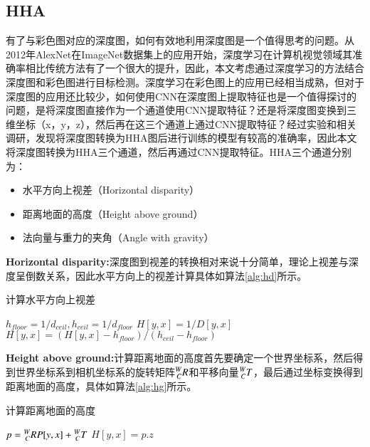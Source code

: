 \subsection{HHA}
有了与彩色图对应的深度图，如何有效地利用深度图是一个值得思考的问题。从2012年AlexNet\cite{Krizhevsky2012}在ImageNet\cite{imagenet}数据集上的应用开始，深度学习在计算机视觉领域其准确率相比传统方法有了一个很大的提升，因此，本文考虑通过深度学习的方法结合深度图和彩色图进行目标检测。深度学习在彩色图上的应用已经相当成熟，但对于深度图的应用还比较少，如何使用CNN在深度图上提取特征也是一个值得探讨的问题，是将深度图直接作为一个通道使用CNN提取特征？还是将深度图变换到三维坐标（x，y，z），然后再在这三个通道上通过CNN提取特征？经过实验和相关调研，发现将深度图转换为HHA图后进行训练的模型有较高的准确率\cite{Gupta2014}，因此本文将深度图转换为HHA三个通道，然后再通过CNN提取特征。HHA三个通道分别为：
\begin{itemize}
\item 水平方向上视差（Horizontal disparity）
\item 距离地面的高度（Height above ground）
\item 法向量与重力的夹角（Angle with gravity）
\end{itemize}
\textbf{Horizontal disparity:}深度图到视差的转换相对来说十分简单，理论上视差与深度呈倒数关系，因此水平方向上的视差计算具体如算法\ref{alg:hd}所示。
\begin{algorithm}[!ht]
  \caption{计算水平方向上视差}
  \label{alg:hd}
  $h_{floor} = 1 / d_{ceil}, h_{ceil} = 1 / d_{floor}$\;
   {
     {
      $H[y, x] = 1 / D[y, x]$\;
      $H[y, x] = (H[y, x] - h_{floor}) / (h_{ceil} - h_{floor})$\;
    }
  }
\end{algorithm}

\textbf{Height above ground:}计算距离地面的高度首先要确定一个世界坐标系，然后得到世界坐标系到相机坐标系的旋转矩阵$\prescript{W}{C}{R}$和平移向量$\prescript{W}{C}{T}$，最后通过坐标变换得到距离地面的高度，具体如算法\ref{alg:hg}所示。
\begin{algorithm}[!ht]
  \caption{计算距离地面的高度}
  \label{alg:hg}
   {
     {
      $p =  \prescript{W}{C}{R}P[y, x] + \prescript{W}{C}{T}$\;
      $H[y, x] = p.z$\;
    }
  }
\end{algorithm}


